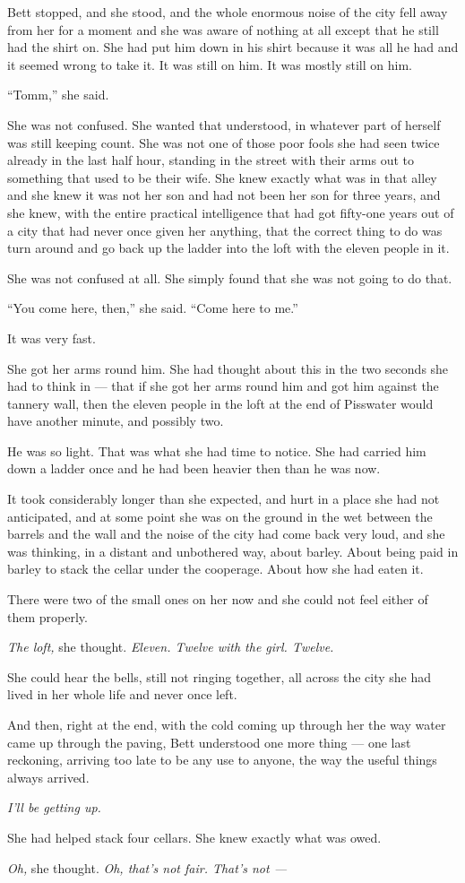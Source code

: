 Bett stopped, and she stood, and the whole enormous noise of the city fell away from her for a moment and she was aware of nothing at all except that he still had the shirt on. She had put him down in his shirt because it was all he had and it seemed wrong to take it. It was still on him. It was mostly still on him.

“Tomm,” she said.

She was not confused. She wanted that understood, in whatever part of herself was still keeping count. She was not one of those poor fools she had seen twice already in the last half hour, standing in the street with their arms out to something that used to be their wife. She knew exactly what was in that alley and she knew it was not her son and had not been her son for three years, and she knew, with the entire practical intelligence that had got fifty-one years out of a city that had never once given her anything, that the correct thing to do was turn around and go back up the ladder into the loft with the eleven people in it.

She was not confused at all. She simply found that she was not going to do that.

“You come here, then,” she said. “Come here to me.”

\sceneBreak

It was very fast.

She got her arms round him. She had thought about this in the two seconds she had to think in — that if she got her arms round him and got him against the tannery wall, then the eleven people in the loft at the end of Pisswater would have another minute, and possibly two.

He was so light. That was what she had time to notice. She had carried him down a ladder once and he had been heavier then than he was now.

It took considerably longer than she expected, and hurt in a place she had not anticipated, and at some point she was on the ground in the wet between the barrels and the wall and the noise of the city had come back very loud, and she was thinking, in a distant and unbothered way, about barley. About being paid in barley to stack the cellar under the cooperage. About how she had eaten it.

There were two of the small ones on her now and she could not feel either of them properly.

\textit{The loft,} she thought. \textit{Eleven. Twelve with the girl. Twelve.}

She could hear the bells, still not ringing together, all across the city she had lived in her whole life and never once left.

And then, right at the end, with the cold coming up through her the way water came up through the paving, Bett understood one more thing — one last reckoning, arriving too late to be any use to anyone, the way the useful things always arrived.

\textit{I’ll be getting up.}

She had helped stack four cellars. She knew exactly what was owed.

\textit{Oh,} she thought. \textit{Oh, that’s not fair. That’s not — }